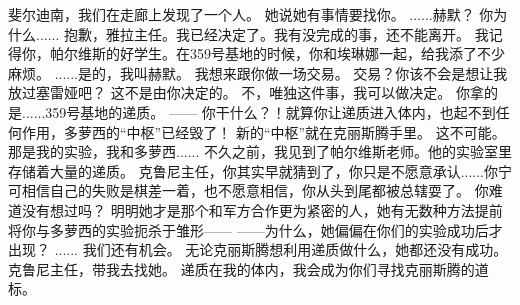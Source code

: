\documentclass[openany]{book}
\begin{document}
\begin{dialogue}
     斐尔迪南，我们在走廊上发现了一个人。
     她说她有事情要找你。
     ......赫默？
     你为什么......
     抱歉，雅拉主任。我已经决定了。我有没完成的事，还不能离开。
     我记得你，帕尔维斯的好学生。在359号基地的时候，你和埃琳娜一起，给我添了不少麻烦。
     ......是的，我叫赫默。
     我想来跟你做一场交易。
     交易？你该不会是想让我放过塞雷娅吧？
     这不是由你决定的。
     不，唯独这件事，我可以做决定。
     你拿的是......359号基地的递质。
     ——
     你干什么？！就算你让递质进入体内，也起不到任何作用，多萝西的“中枢”已经毁了！
     新的“中枢”就在克丽斯腾手里。
     这不可能。那是我的实验，我和多萝西......
     不久之前，我见到了帕尔维斯老师。他的实验室里存储着大量的递质。
     克鲁尼主任，你其实早就猜到了，你只是不愿意承认......你宁可相信自己的失败是棋差一着，也不愿意相信，你从头到尾都被总辖耍了。
     你难道没有想过吗？
     明明她才是那个和军方合作更为紧密的人，她有无数种方法提前将你与多萝西的实验扼杀于雏形——
     ——为什么，她偏偏在你们的实验成功后才出现？
     ......
     我们还有机会。
     无论克丽斯腾想利用递质做什么，她都还没有成功。
     克鲁尼主任，带我去找她。
     递质在我的体内，我会成为你们寻找克丽斯腾的道标。
\end{dialogue}
\end{document}
